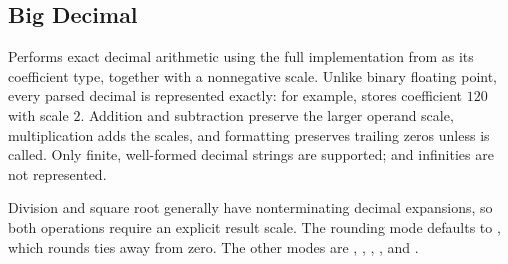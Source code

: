 \subsection{Big Decimal}
\label{sec:6.4.3}
Performs exact decimal arithmetic using the full  implementation from  as its coefficient type, together with a nonnegative scale. Unlike binary floating point, every parsed decimal is represented exactly: for example,  stores coefficient $120$ with scale $2$. Addition and subtraction preserve the larger operand scale, multiplication adds the scales, and formatting preserves trailing zeros unless  is called. Only finite, well-formed decimal strings are supported;  and infinities are not represented.

Division and square root generally have nonterminating decimal expansions, so both operations require an explicit result scale. The rounding mode defaults to , which rounds ties away from zero. The other modes are , , , , and .

